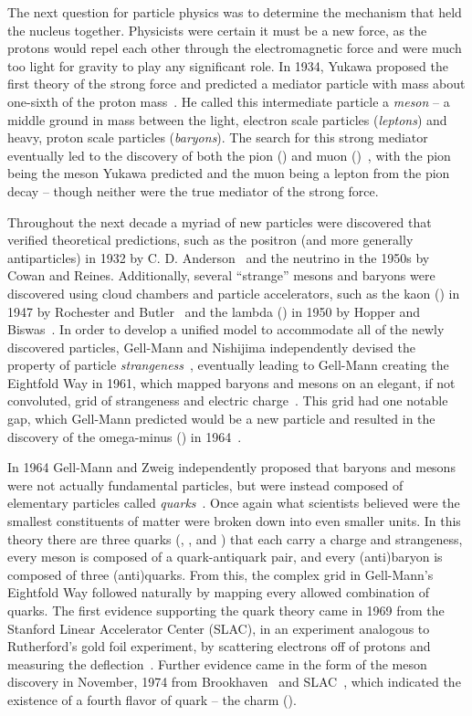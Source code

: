 The next question for particle physics was to determine the mechanism that held the nucleus together. Physicists were certain it must be a new force, as the protons would repel each other through the electromagnetic force and were much too light for gravity to play any significant role. In 1934, Yukawa proposed the first theory of the strong force and predicted a mediator particle with mass about one-sixth of the proton mass~\cite{QFTNutshell}. He called this intermediate particle a \textit{meson} -- a middle ground in mass between the light, electron scale particles (\textit{leptons}) and heavy, proton scale particles (\textit{baryons}). The search for this strong mediator eventually led to the discovery of both the pion (\PGp) and muon (\PGm)~\cite{pion_discovery}, with the pion being the meson Yukawa predicted and the muon being a lepton from the pion decay -- though neither were the true mediator of the strong force.

Throughout the next decade a myriad of new particles were discovered that verified theoretical predictions, such as the positron (and more generally antiparticles) in 1932 by C. D. Anderson~\cite{positron_discovery} and the neutrino in the 1950s by Cowan and Reines\cite{neutrino_discovery}. Additionally, several ``strange'' mesons and baryons were discovered using cloud chambers and particle accelerators, such as the kaon (\PKz) in 1947 by Rochester and Butler~\cite{kaon_discovery} and the lambda (\PGL) in 1950 by Hopper and Biswas~\cite{lambda_discovery}. In order to develop a unified model to accommodate all of the newly discovered particles, Gell-Mann and Nishijima independently devised the property of particle \textit{strangeness}~\cite{strangeness_gellmann,strangeness_nishijima}, eventually leading to Gell-Mann creating the Eightfold Way in 1961, which mapped baryons and mesons on an elegant, if not convoluted, grid of strangeness and electric charge~\cite{eightfoldway}. This grid had one notable gap, which Gell-Mann predicted would be a new particle and resulted in the discovery of the omega-minus (\PGOm) in 1964~\cite{omega_discovery}.

In 1964 Gell-Mann and Zweig independently proposed that baryons and mesons were not actually fundamental particles, but were instead composed of elementary particles called \textit{quarks}~\cite{gellmann_quarks,zweig_quarks}. Once again what scientists believed were the smallest constituents of matter were broken down into even smaller units. In this theory there are three quarks (\PQu, \PQd, and \PQs) that each carry a charge and strangeness, every meson is composed of a quark-antiquark pair, and every (anti)baryon is composed of three (anti)quarks. From this, the complex grid in Gell-Mann's Eightfold Way followed naturally by mapping every allowed combination of quarks. The first evidence supporting the quark theory came in 1969 from the Stanford Linear Accelerator Center (SLAC), in an experiment analogous to Rutherford's gold foil experiment, by scattering electrons off of protons and measuring the deflection~\cite{slac_quark}. Further evidence came in the form of the \PJGy meson discovery in November, 1974 from Brookhaven~\cite{jpsi_brookhaven} and SLAC~\cite{jpsi_slac}, which indicated the existence of a fourth flavor of quark -- the charm (\PQc).

